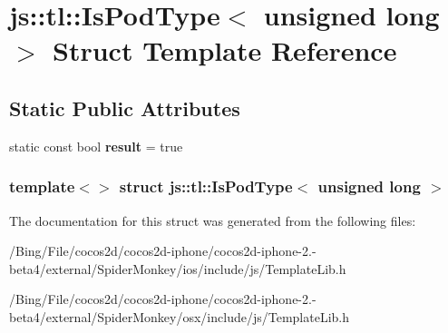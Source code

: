 \hypertarget{structjs_1_1tl_1_1_is_pod_type_3_01unsigned_01long_01_4}{\section{js\-:\-:tl\-:\-:Is\-Pod\-Type$<$ unsigned long $>$ Struct Template Reference}
\label{structjs_1_1tl_1_1_is_pod_type_3_01unsigned_01long_01_4}
}
\subsection*{Static Public Attributes}
\begin{DoxyCompactItemize}
\item 
\hypertarget{structjs_1_1tl_1_1_is_pod_type_3_01unsigned_01long_01_4_a9a66d9ba2fc6df3cfee3e5514b65f34a}{static const bool {\bfseries result} = true}\label{structjs_1_1tl_1_1_is_pod_type_3_01unsigned_01long_01_4_a9a66d9ba2fc6df3cfee3e5514b65f34a}

\end{DoxyCompactItemize}
\subsubsection*{template$<$$>$ struct js\-::tl\-::\-Is\-Pod\-Type$<$ unsigned long $>$}



The documentation for this struct was generated from the following files\-:\begin{DoxyCompactItemize}
\item 
/\-Bing/\-File/cocos2d/cocos2d-\/iphone/cocos2d-\/iphone-\/2.-\/beta4/external/\-Spider\-Monkey/ios/include/js/Template\-Lib.\-h\item 
/\-Bing/\-File/cocos2d/cocos2d-\/iphone/cocos2d-\/iphone-\/2.-\/beta4/external/\-Spider\-Monkey/osx/include/js/Template\-Lib.\-h\end{DoxyCompactItemize}
